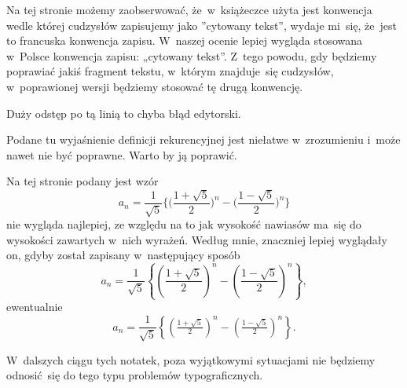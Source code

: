 \documentclass[a4paper,11pt]{article}
\begin{document}
 Na tej stronie możemy zaobserwować, że~w~książeczce użyta jest
konwencja wedle której cudzysłów zapisujemy jako ”cytowany tekst”, wydaje
mi~się, że~jest to francuska konwencja zapisu. W~naszej ocenie lepiej
wygląda stosowana w~Polsce konwencja zapisu: „cytowany tekst”. Z~tego
powodu, gdy będziemy poprawiać jakiś fragment tekstu, w~którym znajduje~się
cudzysłów, w~poprawionej wersji będziemy stosować tę drugą konwencję.

\vspace{\spaceFour}





 Duży odstęp po tą linią to chyba błąd edytorski.

\vspace{\spaceFour}





 Podane tu wyjaśnienie definicji rekurencyjnej jest niełatwe
w~zrozumieniu i~może nawet nie być poprawne. Warto by ją poprawić.

\vspace{\spaceFour}





 Na tej stronie podany jest wzór
\begin{equation}
  \label{eq:Gancarzewicz-Arytmetyka-01}
  a_{ n } =
  \frac{ 1 }{ \sqrt{ 5 } }
  \Big\{ \Big( \frac{ 1 + \sqrt{ 5 } }{ 2 } \Big)^{ n }
  - \Big( \frac{ 1 - \sqrt{5} }{ 2 } \Big)^{ n } \Big\}
\end{equation}
nie wygląda najlepiej, ze względu na to jak wysokość nawiasów ma~się
do wysokości zawartych w~nich wyrażeń. Według mnie, znaczniej lepiej
wyglądały on, gdyby został zapisany w~następujący sposób
\begin{equation}
  \label{eq:Gancarzewicz-Arytmetyka-01}
  a_{ n } =
  \frac{ 1 }{ \sqrt{ 5 } }
  \left\{ \left( \frac{ 1 + \sqrt{ 5 } }{ 2 } \right)^{ n }
  - \left( \frac{ 1 - \sqrt{5} }{ 2 } \right)^{ n } \right\},
\end{equation}
ewentualnie
\begin{equation}
  \label{eq:Gancarzewicz-Arytmetyka-02}
  a_{ n } =
  \frac{ 1 }{ \sqrt{ 5 } }
  \left\{ \left( \tfrac{ 1 + \sqrt{ 5 } }{ 2 } \right)^{ n }
  - \left( \tfrac{ 1 - \sqrt{5} }{ 2 } \right)^{ n } \right\}.
\end{equation}

W~dalszych ciągu tych notatek, poza wyjątkowymi sytuacjami nie będziemy
odnosić~się do tego typu problemów typograficznych.
\end{document}
